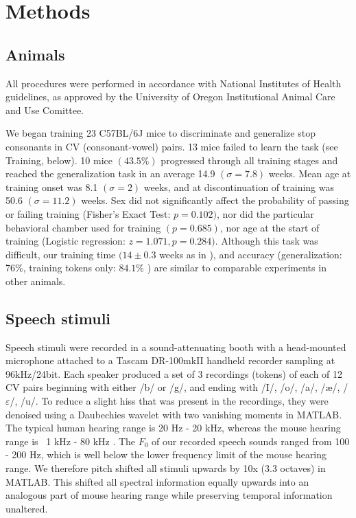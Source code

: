 \section{Methods}

\subsection{Animals}

All procedures were performed in accordance with National Institutes of Health guidelines, as approved by the University of Oregon Institutional Animal Care and Use Comittee.

We began training 23 C57BL/6J mice to discriminate and generalize stop consonants in CV (consonant-vowel) pairs. 13 mice failed to learn the task (see Training, below). 10 mice $ (43.5\%) $ progressed through all training stages and reached the generalization task in an average 14.9 $(\sigma = 7.8)$ weeks. Mean age at training onset was 8.1 $(\sigma = 2)$ weeks, and at discontinuation of training was 50.6 $(\sigma = 11.2)$ weeks. Sex did not significantly affect the probability of passing or failing training (Fisher's Exact Test: $p = 0.102)$, nor did the particular behavioral chamber used for training $ (p = 0.685) $, nor age at the start of training (Logistic regression: $z = 1.071, p=0.284)$. Although this task was difficult, our training time $(14\pm 0.3$ weeks as in \citep{Engineer2015}), and accuracy (generalization: 76\%\citep{Kluender1987}, training tokens only: $84.1\%$ \citep{Engineer2015}) are similar to comparable experiments in other animals.

\subsection{Speech stimuli}

Speech stimuli were recorded in a sound-attenuating booth with a head-mounted microphone attached to a Tascam DR-100mkII handheld recorder sampling at 96kHz/24bit. Each speaker produced a set of 3 recordings (tokens) of each of 12 CV pairs beginning with either /b/ or /g/, and ending with /I/, /o/, /a/, /\ae/, /$\varepsilon$/, /u/. To reduce a slight hiss that was present in the recordings, they were denoised using a Daubechies wavelet with two vanishing moments in MATLAB. The typical human hearing range is 20 Hz - 20 kHz, whereas the mouse hearing range is ~1 kHz - 80 kHz \citep{Radziwon2009}. The $F_0$ of our recorded speech sounds ranged from 100 - 200 Hz, which is well below the lower frequency limit of the mouse hearing range. We therefore pitch shifted all stimuli upwards by 10x (3.3 octaves) in MATLAB. This shifted all spectral information equally upwards into an analogous part of mouse hearing range while preserving temporal information unaltered.

